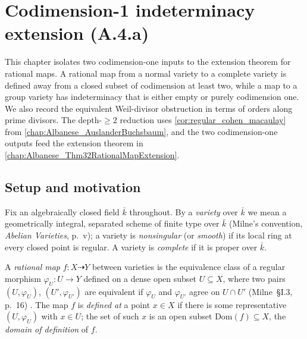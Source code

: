 
\chapter{Codimension-1 indeterminacy extension (A.4.a)}
\label{chap:Albanese_CodimOneExtension}

This chapter isolates two codimension-one inputs to the extension theorem for rational
maps.  A rational map from a normal variety to a complete variety is defined away from a
closed subset of codimension at least two, while a map to a group variety has indeterminacy
that is either empty or purely codimension one.  We also record the equivalent
Weil-divisor obstruction in terms of orders along prime divisors.
The depth-\(\geq 2\) reduction uses
\cref{cor:regular_cohen_macaulay} from
\cref{chap:Albanese_AuslanderBuchsbaum}, and the two codimension-one outputs
feed the extension theorem in \cref{chap:Albanese_Thm32RationalMapExtension}.

\section{Setup and motivation}
\label{sec:codim1_setup}

Fix an algebraically closed field \(\bar k\) throughout. By a \emph{variety} over \(\bar k\)
we mean a geometrically integral, separated scheme of finite type over \(\bar k\)
(Milne's convention, \emph{Abelian Varieties}, p.~v); a variety is \emph{nonsingular}
(or \emph{smooth}) if its local ring at every closed point is regular. A variety is
\emph{complete} if it is proper over \(\bar k\).

A \emph{rational map} \(f \colon X \dashrightarrow Y\) between varieties is the equivalence
class of a regular morphism \(\varphi_U \colon U \to Y\) defined on a dense open subset
\(U \subseteq X\), where two pairs \((U, \varphi_U)\), \((U', \varphi_{U'})\) are equivalent
if \(\varphi_U\) and \(\varphi_{U'}\) agree on \(U \cap U'\) (Milne~\S I.3, p.~16) \cite{milne-av}. The map \(f\)
is \emph{defined at} a point \(x \in X\) if there is some representative \((U, \varphi_U)\)
with \(x \in U\); the set of such \(x\) is an open subset \(\mathrm{Dom}(f) \subseteq X\),
the \emph{domain of definition} of \(f\).

